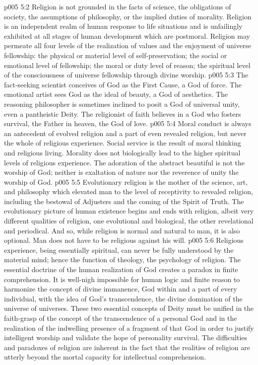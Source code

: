 \vs p005 5:2 Religion is not grounded in the facts of science, the obligations of society, the assumptions of philosophy, or the implied duties of morality. Religion is an independent realm of human response to life situations and is unfailingly exhibited at all stages of human development which are postmoral. Religion may permeate all four levels of the realization of values and the enjoyment of universe fellowship: the physical or material level of self\hyp{}preservation; the social or emotional level of fellowship; the moral or duty level of reason; the spiritual level of the consciousness of universe fellowship through divine worship.
\vs p005 5:3 The fact\hyp{}seeking scientist conceives of God as the First Cause, a God of force. The emotional artist sees God as the ideal of beauty, a God of aesthetics. The reasoning philosopher is sometimes inclined to posit a God of universal unity, even a pantheistic Deity. The religionist of faith believes in a God who fosters survival, the Father in heaven, the God of love.
\vs p005 5:4 \pc Moral conduct is always an antecedent of evolved religion and a part of even revealed religion, but never the whole of religious experience. Social service is the result of moral thinking and religious living. Morality does not biologically lead to the higher spiritual levels of religious experience. The adoration of the abstract beautiful is not the worship of God; neither is exaltation of nature nor the reverence of unity the worship of God.
\vs p005 5:5 Evolutionary religion is the mother of the science, art, and philosophy which elevated man to the level of receptivity to revealed religion, including the bestowal of Adjusters and the coming of the Spirit of Truth. The evolutionary picture of human existence begins and ends with religion, albeit very different qualities of religion, one evolutional and biological, the other revelational and periodical. And so, while religion is normal and natural to man, it is also optional. Man does not have to be religious against his will.
\vs p005 5:6 \pc Religious experience, being essentially spiritual, can never be fully understood by the material mind; hence the function of theology, the psychology of religion. The essential doctrine of the human realization of God creates a paradox in finite comprehension. It is well\hyp{}nigh impossible for human logic and finite reason to harmonize the concept of divine immanence, God within and a part of every individual, with the idea of God’s transcendence, the divine domination of the universe of universes. These two essential concepts of Deity must be unified in the faith\hyp{}grasp of the concept of the transcendence of a personal God and in the realization of the indwelling presence of a fragment of that God in order to justify intelligent worship and validate the hope of personality survival. The difficulties and paradoxes of religion are inherent in the fact that the realities of religion are utterly beyond the mortal capacity for intellectual comprehension.
